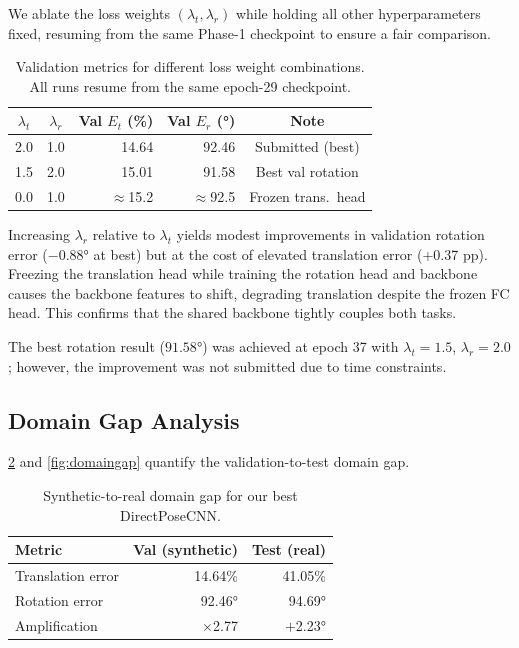 \documentclass[10pt,twocolumn,letterpaper]{article}
\begin{document}
We ablate the loss weights $(\lambda_t, \lambda_r)$ while holding all
other hyperparameters fixed, resuming from the same Phase-1 checkpoint
to ensure a fair comparison.

\begin{table}[h]
\centering
\small
\setlength{\tabcolsep}{5pt}
\caption{Validation metrics for different loss weight combinations.
All runs resume from the same epoch-29 checkpoint.}
\label{tab:ablation}
\begin{tabular}{ccrrc}
\toprule
$\lambda_t$ & $\lambda_r$ & Val $E_t$ (\%) & Val $E_r$ (°) & Note \\
\midrule
2.0 & 1.0 & 14.64 & 92.46 & Submitted (best) \\
1.5 & 2.0 & 15.01 & 91.58 & Best val rotation \\
0.0 & 1.0 & $\approx$15.2 & $\approx$92.5 & Frozen trans.\ head \\
\bottomrule
\end{tabular}
\end{table}

Increasing $\lambda_r$ relative to $\lambda_t$ yields modest
improvements in validation rotation error (−0.88° at best) but at the
cost of elevated translation error (+0.37 pp).
Freezing the translation head while training the rotation head and
backbone causes the backbone features to shift, degrading translation
despite the frozen FC head.  This confirms that the shared backbone
tightly couples both tasks.

The best rotation result ($91.58°$) was achieved at epoch 37 with
$\lambda_t=1.5$, $\lambda_r=2.0$; however, the improvement was not
submitted due to time constraints.

\subsection{Domain Gap Analysis}
\label{sec:domaingap}

\cref{tab:gap} and \cref{fig:domaingap} quantify the
validation-to-test domain gap.

\begin{table}[h]
\centering
\small
\setlength{\tabcolsep}{5pt}
\caption{Synthetic-to-real domain gap for our best DirectPoseCNN.}
\label{tab:gap}
\begin{tabular}{lrr}
\toprule
Metric & Val (synthetic) & Test (real) \\
\midrule
Translation error & 14.64\% & 41.05\% \\
Rotation error    & 92.46°  & 94.69° \\
\midrule
Amplification     & $\times$2.77 & $+$2.23° \\
\bottomrule
\end{tabular}
\end{table}
\end{document}
